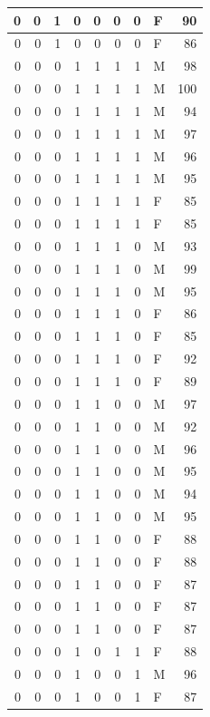 \documentclass[
  12pt,
]{krantz}
\begin{document}
\begin{tabular}{r|r|r|r|r|r|r|l|r}
\hline
0 & 0 & 1 & 0 & 0 & 0 & 0 & F & 90\\
\hline
0 & 0 & 1 & 0 & 0 & 0 & 0 & F & 86\\
\hline
0 & 0 & 0 & 1 & 1 & 1 & 1 & M & 98\\
\hline
0 & 0 & 0 & 1 & 1 & 1 & 1 & M & 100\\
\hline
0 & 0 & 0 & 1 & 1 & 1 & 1 & M & 94\\
\hline
0 & 0 & 0 & 1 & 1 & 1 & 1 & M & 97\\
\hline
0 & 0 & 0 & 1 & 1 & 1 & 1 & M & 96\\
\hline
0 & 0 & 0 & 1 & 1 & 1 & 1 & M & 95\\
\hline
0 & 0 & 0 & 1 & 1 & 1 & 1 & F & 85\\
\hline
0 & 0 & 0 & 1 & 1 & 1 & 1 & F & 85\\
\hline
0 & 0 & 0 & 1 & 1 & 1 & 0 & M & 93\\
\hline
0 & 0 & 0 & 1 & 1 & 1 & 0 & M & 99\\
\hline
0 & 0 & 0 & 1 & 1 & 1 & 0 & M & 95\\
\hline
0 & 0 & 0 & 1 & 1 & 1 & 0 & F & 86\\
\hline
0 & 0 & 0 & 1 & 1 & 1 & 0 & F & 85\\
\hline
0 & 0 & 0 & 1 & 1 & 1 & 0 & F & 92\\
\hline
0 & 0 & 0 & 1 & 1 & 1 & 0 & F & 89\\
\hline
0 & 0 & 0 & 1 & 1 & 0 & 0 & M & 97\\
\hline
0 & 0 & 0 & 1 & 1 & 0 & 0 & M & 92\\
\hline
0 & 0 & 0 & 1 & 1 & 0 & 0 & M & 96\\
\hline
0 & 0 & 0 & 1 & 1 & 0 & 0 & M & 95\\
\hline
0 & 0 & 0 & 1 & 1 & 0 & 0 & M & 94\\
\hline
0 & 0 & 0 & 1 & 1 & 0 & 0 & M & 95\\
\hline
0 & 0 & 0 & 1 & 1 & 0 & 0 & F & 88\\
\hline
0 & 0 & 0 & 1 & 1 & 0 & 0 & F & 88\\
\hline
0 & 0 & 0 & 1 & 1 & 0 & 0 & F & 87\\
\hline
0 & 0 & 0 & 1 & 1 & 0 & 0 & F & 87\\
\hline
0 & 0 & 0 & 1 & 1 & 0 & 0 & F & 87\\
\hline
0 & 0 & 0 & 1 & 0 & 1 & 1 & F & 88\\
\hline
0 & 0 & 0 & 1 & 0 & 0 & 1 & M & 96\\
\hline
0 & 0 & 0 & 1 & 0 & 0 & 1 & F & 87\\

\end{tabular}
\end{document}
